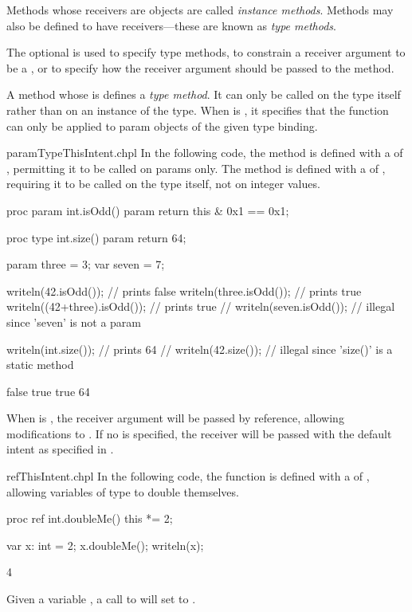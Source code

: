 Methods whose receivers are objects are called \emph{instance
methods}.  Methods may also be defined to have 
receivers---these are known as \emph{type methods}.

The optional  is used to specify type methods, to
constrain a receiver argument to be a , or to specify how
the receiver argument should be passed to the method.

A method whose  is  defines a \emph{type
method}.  It can only be called on the type itself rather than on an
instance of the type.  When  is , it
specifies that the function can only be applied to param objects of
the given type binding.

\begin{chapelexample}{paramTypeThisIntent.chpl}
In the following code, the  method is defined with
a  of , permitting it to be called on
params only.  The  method is defined with
a  of , requiring it to be called on
the  type itself, not on integer values.
\begin{chapel}
proc param int.isOdd() param {
  return this & 0x1 == 0x1;
}

proc type int.size() param {
  return 64;
}

param three = 3;
var seven = 7;

writeln(42.isOdd());          // prints false
writeln(three.isOdd());       // prints true
writeln((42+three).isOdd());  // prints true
// writeln(seven.isOdd());    // illegal since 'seven' is not a param

writeln(int.size());          // prints 64
// writeln(42.size());        // illegal since 'size()' is a static method
\end{chapel}
\begin{chapeloutput}
false
true
true
64
\end{chapeloutput}
\end{chapelexample}

When  is , the receiver argument will be
passed by reference, allowing modifications to .  If
no  is specified, the receiver will be passed with
the default intent as specified in .

\begin{chapelexample}{refThisIntent.chpl}
In the following code, the  function is defined with a
 of , allowing variables of type  to
double themselves.
\begin{chapel}
proc ref int.doubleMe() { this *= 2; }
\end{chapel}
\begin{chapelpost}
var x: int = 2;
x.doubleMe();
writeln(x);
\end{chapelpost}
\begin{chapeloutput}
4
\end{chapeloutput}
Given a variable , a call to  will set 
to .
\end{chapelexample}

